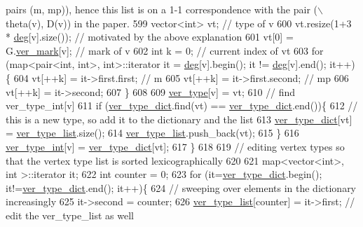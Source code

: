 \begin{DoxyCode}
{       pairs (m, mp)), hence this list is on a 1-1 correspondence with the pair (\(\backslash\)theta(v), D(v)) in the paper.}
599     vector<int> vt; \textcolor{comment}{// type of v}
600     vt.resize(1+3 * \hyperlink{classcolored__graph_ae3269d35c1b022bc70d195bebd4e1b8a}{deg}[v].size()); \textcolor{comment}{// motivated by the above explanation}
601     vt[0] = G.\hyperlink{classmarked__graph_ac83e9377dd4d8bb95be1ac949b127296}{ver\_mark}[v]; \textcolor{comment}{// mark of v}
602     \textcolor{keywordtype}{int} k = 0; \textcolor{comment}{// current index of vt}
603     \textcolor{keywordflow}{for} (map<pair<int, int>, \textcolor{keywordtype}{int}>::iterator it = \hyperlink{classcolored__graph_ae3269d35c1b022bc70d195bebd4e1b8a}{deg}[v].begin(); it != \hyperlink{classcolored__graph_ae3269d35c1b022bc70d195bebd4e1b8a}{deg}[v].end(); it++)\{
604       vt[++k] = it->first.first; \textcolor{comment}{// m}
605       vt[++k] = it->first.second; \textcolor{comment}{// mp}
606       vt[++k] = it->second;
607     \}
608 
609     \hyperlink{classcolored__graph_a2cc32e7146fa3319f83cfa940f5e1be4}{ver\_type}[v] = vt;
610     \textcolor{comment}{// find ver\_type\_int[v]}
611     \textcolor{keywordflow}{if} (\hyperlink{classcolored__graph_aeb780762429ddac375799f4a45405712}{ver\_type\_dict}.find(vt) == \hyperlink{classcolored__graph_aeb780762429ddac375799f4a45405712}{ver\_type\_dict}.end())\{
612       \textcolor{comment}{// this is a new type, so add it to the dictionary and the list }
613       \hyperlink{classcolored__graph_aeb780762429ddac375799f4a45405712}{ver\_type\_dict}[vt] = \hyperlink{classcolored__graph_a3a1ae8abac458d20a2afb4aa48bbc956}{ver\_type\_list}.size();
614       \hyperlink{classcolored__graph_a3a1ae8abac458d20a2afb4aa48bbc956}{ver\_type\_list}.push\_back(vt);
615     \}
616     \hyperlink{classcolored__graph_a491ed2ea1a65118af02ec606c8d44c0a}{ver\_type\_int}[v] = \hyperlink{classcolored__graph_aeb780762429ddac375799f4a45405712}{ver\_type\_dict}[vt];
617   \}
618 
619   \textcolor{comment}{// editing vertex types so that the vertex type list is sorted lexicographically}
620   
621   map<vector<int>, \textcolor{keywordtype}{int} >::iterator it;
622   \textcolor{keywordtype}{int} counter = 0;
623   \textcolor{keywordflow}{for} (it=\hyperlink{classcolored__graph_aeb780762429ddac375799f4a45405712}{ver\_type\_dict}.begin(); it!=\hyperlink{classcolored__graph_aeb780762429ddac375799f4a45405712}{ver\_type\_dict}.end(); it++)\{
624     \textcolor{comment}{// sweeping over elements in the dictionary increasingly }
625     it->second = counter; 
626     \hyperlink{classcolored__graph_a3a1ae8abac458d20a2afb4aa48bbc956}{ver\_type\_list}[counter] = it->first; \textcolor{comment}{// edit the ver\_type\_list as well}

\end{DoxyCode}
